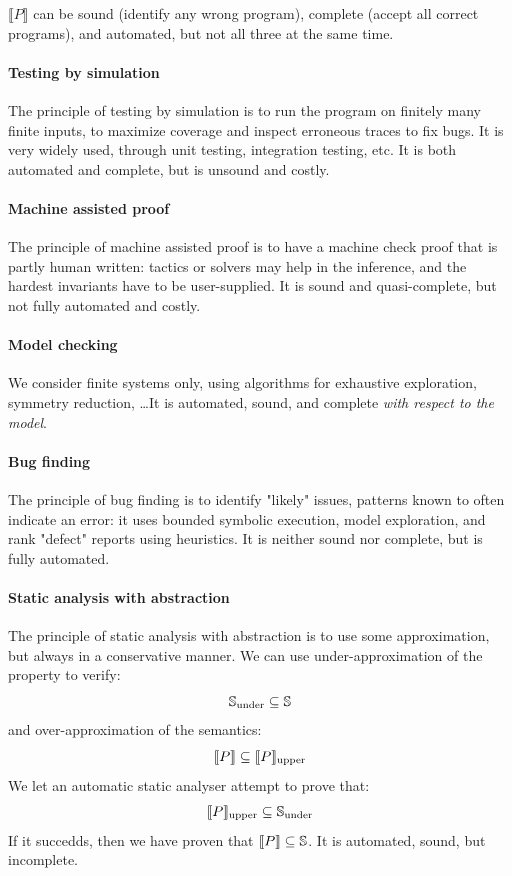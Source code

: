\documentclass[toc, titlepaged]{../cs-classes/cs-classes}
\begin{document}
$\llbracket P\rrbracket$ can be sound (identify any wrong program), complete (accept all correct programs), and automated, but not all three at the same time.

\paragraph*{Testing by simulation}
The principle of testing by simulation is to run the program on finitely many finite inputs, to maximize coverage and inspect erroneous traces to fix bugs. It is very widely used, through unit testing, integration testing, etc. It is both automated and complete, but is unsound and costly.

\paragraph*{Machine assisted proof}
The principle of machine assisted proof is to have a machine check proof that is partly human written: tactics or solvers may help in the inference, and the hardest invariants have to be user-supplied. It is sound and quasi-complete, but not fully automated and costly.

\paragraph*{Model checking}
We consider finite systems only, using algorithms for exhaustive exploration, symmetry reduction, \dots It is automated, sound, and complete \emph{with respect to the model}.

\paragraph*{Bug finding}
The principle of bug finding is to identify "likely" issues, patterns known to often indicate an error: it uses bounded symbolic execution, model exploration, and rank "defect" reports using heuristics. It is neither sound nor complete, but is fully automated.

\paragraph*{Static analysis with abstraction}
The principle of static analysis with abstraction is to use some approximation, but always in a conservative manner. We can use under-approximation of the property to verify:
\begin{equation*}
    \S_{\textnormal{under}}\subseteq\S
\end{equation*}
and over-approximation of the semantics:
\begin{equation*}
    \llbracket P\rrbracket\subseteq\llbracket P\rrbracket_{\textnormal{upper}}
\end{equation*}
We let an automatic static analyser attempt to prove that:
\begin{equation*}
    \llbracket P\rrbracket_{\textnormal{upper}}\subseteq\S_{\textnormal{under}}
\end{equation*}
If it succedds, then we have proven that $\llbracket P\rrbracket\subseteq\S$. It is automated, sound, but incomplete.
\end{document}
